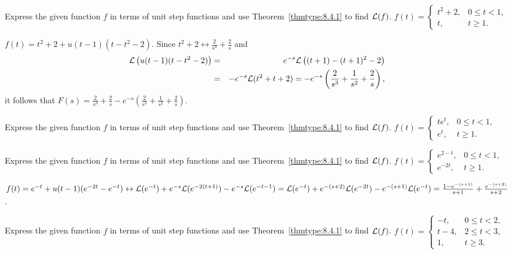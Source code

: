\documentclass{ximera}
\begin{document}
 \begin{problem}\label{exer:8.4.8}
Express the
given function $f$ in terms of unit step functions
 and use Theorem~\ref{thmtype:8.4.1} to find ${\cal L}(f)$.
 $f(t)=\left\{\begin{array}{cl} t^2+2, &0\le
t<1,\\ t,&t\ge1.\end{array}\right.$

\begin{solution}
$f(t)=t^2+2+u(t-1)(t-t^2-2)$.
Since $t^2+2\leftrightarrow\frac{2}{s^3}+\frac{2}{s}$  and
\begin{eqnarray*}
{\cal L}\left(u(t-1)(t-t^2-2)\right)&=&e^{-s}{\cal
L}\left((t+1)-(t+1)^2-2\right)\\&=&-e^{-s}{\cal
L}(t^2+t+2)=-e^{-s}\left(\frac{2}{s^3}+\frac{1}{s^2}+\frac{2}{s}\right),
\end{eqnarray*}
it follows that $F(s)=\frac{2}{s^3} +\frac{2}{s}-e^{-s}\left(\frac{2}{s^3}+\frac{1}{s^2}+\frac{2}{s}\right)$.
\end{solution}
\end{problem}
 \begin{problem}\label{exer:8.4.9}
Express the
given function $f$ in terms of unit step functions
 and use Theorem~\ref{thmtype:8.4.1} to find ${\cal L}(f)$.
 $f(t)=\left\{\begin{array}{cl} te^t,& 0\le t
<1,\\ e^t,&t\ge1.\end{array}\right.$
\end{problem}

\begin{problem}\label{exer:8.4.10} 
Express the
given function $f$ in terms of unit step functions
 and use Theorem~\ref{thmtype:8.4.1} to find ${\cal L}(f)$.
$f(t)=\left\{\begin{array}{cl}
e^{2-t}, &0\le t<1,\\ 
e^{-2t},&t\ge1.\end{array}\right.$

\begin{solution}
$f(t)=e^{-t}+u(t-1)(e^{-2t}-e^{-t})
\leftrightarrow {\cal L}(e^{-t})+e^{-s}{\cal
L}(e^{-2(t+1)})-e^{-s}{\cal L}(e^{-t-1})=
 {\cal L}(e^{-t})+e^{-(s+2)}{\cal
L}(e^{-2t})-e^{-(s+1)}{\cal L}(e^{-t})=
\frac{1-e^{-(s+1)}}{s+1}+\frac{e^{-(s+2)}}{s+2}$.
\end{solution}
\end{problem}

\begin{problem}\label{exer:8.4.11}
Express the
given function $f$ in terms of unit step functions
 and use Theorem~\ref{thmtype:8.4.1} to find ${\cal L}(f)$. 
$f(t)=\left\{\begin{array}{cl} -t,&0 \le
t<2,\\ t-4,&2\le t<3,\\ 1,&t\ge3.
\end{array}\right.$
\end{problem}
\end{document}
